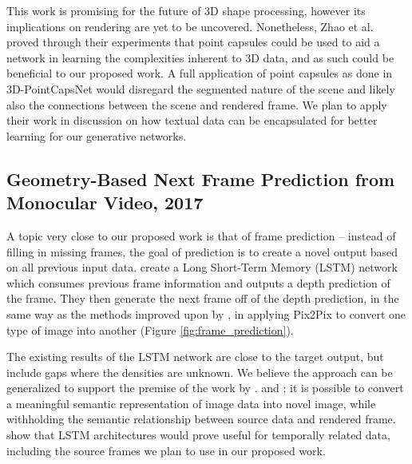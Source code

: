 \documentclass{article}
\begin{document}
This work is promising for the future of 3D shape processing, however its
implications on rendering are yet to be uncovered. Nonetheless, Zhao et al.
proved through their experiments that point capsules could be used to
aid a network in learning the complexities inherent to 3D data, and as such
could be beneficial to our proposed work. A full application of point capsules
as done in 3D-PointCapsNet would disregard the segmented nature of the scene and
likely also the connections between the scene and rendered frame.
We plan to apply their work in discussion on how textual data can be encapsulated
for better learning for our generative networks.

\subsection*{Geometry-Based Next Frame Prediction from Monocular Video, 2017}
\nocite{frame_prediction}
A topic very close to our proposed work is that of frame prediction --
instead of filling in missing frames, the goal of prediction is to create a novel
output based on all previous input data.
\cite{frame_prediction} create a Long Short-Term Memory (LSTM) network
which consumes previous frame information and outputs a depth prediction of the
frame. They then generate the next frame off of the depth prediction, in the same
way as the methods improved upon by \cite{image_to_image},
in applying Pix2Pix to convert one type of image into another
(Figure \ref{fig:frame_prediction}).

The existing results of the LSTM network are close to the
target output, but include gaps where the densities are unknown.
We believe the approach can be generalized to support the premise of
the work by \cite{path_tracing}. and \cite{image_to_image};
it is possible to convert a meaningful semantic representation
of image data into novel image, while withholding the semantic relationship
between source data and rendered frame. \cite{frame_prediction} show that
LSTM architectures would prove useful for temporally related data,
including the source frames we plan to use in our proposed work.
\end{document}
